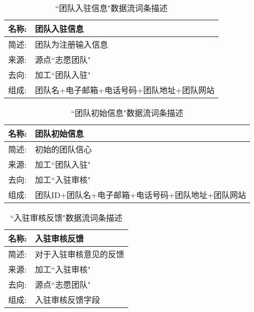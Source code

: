 \begin{table}[H]  
\caption{``团队入驻信息"数据流词条描述}  
\begin{center}  
    \begin{tabular}{l p{11cm}} 
        \hline
        \quad 名称:  &  团队入驻信息 \\
        \hline
        \quad 简述:  & 团队为注册输入信息 \\
        \hline
        \quad 来源:  & 源点``志愿团队"\\
        \hline
        \quad 去向:  & 加工``团队入驻" \\
        \hline
        \quad 组成:  & 团队名+电子邮箱+电话号码+团队地址+团队网站 \\
        \hline
    \end{tabular}
    \label{tab1}
\end{center}
\end{table}

\begin{table}[H]  
\caption{``团队初始信息"数据流词条描述}  
\begin{center}  
    \begin{tabular}{l p{11cm}} 
        \hline
        \quad 名称:  &   团队初始信息 \\
        \hline
        \quad 简述:  & 初始的团队信心 \\
        \hline
        \quad 来源:  & 加工``团队入驻"\\
        \hline
        \quad 去向:  & 加工``入驻审核" \\
        \hline
        \quad 组成:  & 团队ID+团队名+电子邮箱+电话号码+团队地址+团队网站\\
        \hline
    \end{tabular}
    \label{tab1}
\end{center}
\end{table}

\begin{table}[H]  
\caption{``入驻审核反馈"数据流词条描述}  
\begin{center}  
    \begin{tabular}{l p{11cm}} 
        \hline
        \quad 名称:  &   入驻审核反馈 \\
        \hline
        \quad 简述:  & 对于入驻审核意见的反馈 \\
        \hline
        \quad 来源:  & 加工``入驻审核" \\
        \hline
        \quad 去向:  & 源点``志愿团队" \\
        \hline
        \quad 组成:  & 入驻审核反馈字段\\
        \hline
    \end{tabular}
    \label{tab1}
\end{center}
\end{table}

